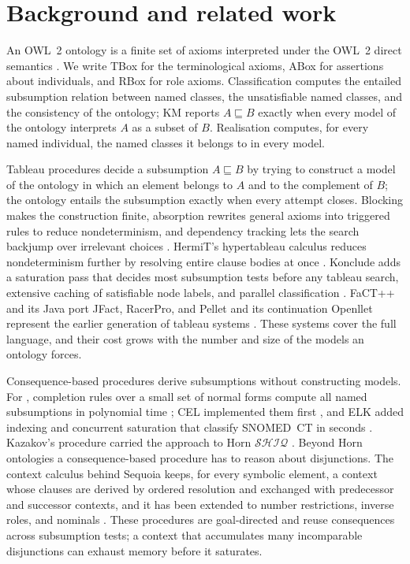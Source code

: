 \section{Background and related work}
\label{sec:background}

An OWL~2 ontology is a finite set of axioms interpreted under the OWL~2 direct
semantics \cite{w3c2012direct,w3c2012profiles}.  We write TBox for the
terminological axioms, ABox for assertions about individuals, and RBox for role
axioms.  Classification computes the entailed subsumption relation between
named classes, the unsatisfiable named classes, and the consistency of the
ontology; KM reports $A\sqsubseteq B$ exactly when every model of the ontology
interprets $A$ as a subset of $B$.  Realisation computes, for every named
individual, the named classes it belongs to in every model.

Tableau procedures decide a subsumption $A\sqsubseteq B$ by trying to construct
a model of the ontology in which an element belongs to $A$ and to the
complement of $B$; the ontology entails the subsumption exactly when every
attempt closes.  Blocking makes the construction finite, absorption rewrites
general axioms into triggered rules to reduce nondeterminism, and dependency
tracking lets the search backjump over irrelevant choices
\cite{horrocks1999optimizing,horrocks2007implementation,tsarkov2007optimizing}.
HermiT's hypertableau calculus reduces nondeterminism further by resolving
entire clause bodies at once \cite{motik2009hypertableau,glimm2014hermit}.
Konclude adds a saturation pass that decides most subsumption tests before any
tableau search, extensive caching of satisfiable node labels, and parallel
classification \cite{steigmiller2014konclude,steigmiller2014coupling}.  FaCT++
and its Java port JFact, RacerPro, and Pellet and its continuation Openllet
represent the earlier generation of tableau systems
\cite{tsarkov2006factpp,palmisano2018jfact,haarslev2012racerpro,sirin2007pellet,galigator2019openllet}.
These systems cover the full language, and their cost grows with the number
and size of the models an ontology forces.

Consequence-based procedures derive subsumptions without constructing models.
For \EL{}, completion rules over a small set of normal forms compute all
named subsumptions in polynomial time \cite{baader2005el}; CEL implemented
them first \cite{baader2006cel}, and ELK added indexing and concurrent
saturation that classify SNOMED~CT in seconds
\cite{kazakov2011concurrent,kazakov2014elk}.  Kazakov's procedure carried the
approach to Horn $\mathcal{SHIQ}$ \cite{kazakov2009horn}.  Beyond Horn
ontologies a consequence-based procedure has to reason about disjunctions.
The context calculus behind Sequoia keeps, for every symbolic element, a
context whose clauses are derived by ordered resolution and exchanged with
predecessor and successor contexts, and it has been extended to number
restrictions, inverse roles, and nominals
\cite{bate2016sequoia,bate2018consequence,tenacucala2018consequence,tenacucala2021payg}.
These procedures are goal-directed and reuse consequences across subsumption
tests; a context that accumulates many incomparable disjunctions can exhaust
memory before it saturates.

